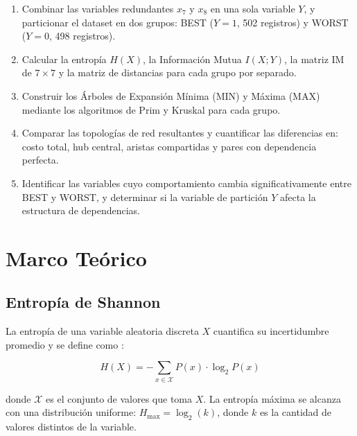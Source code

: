 \documentclass[12pt, a4paper]{article}
\begin{document}
\begin{enumerate}
    \item Combinar las variables redundantes $x_7$ y $x_8$ en una sola
          variable $Y$, y particionar el dataset en dos grupos:
          BEST ($Y = 1$, 502 registros) y WORST ($Y = 0$, 498 registros).

    \item Calcular la entropía $H(X)$, la Información Mutua
          $I(X;Y)$, la matriz IM de $7 \times 7$ y la matriz de
          distancias para cada grupo por separado.

    \item Construir los Árboles de Expansión Mínima (MIN) y
          Máxima (MAX) mediante los algoritmos de Prim y Kruskal
          para cada grupo.

    \item Comparar las topologías de red resultantes y cuantificar
          las diferencias en: costo total, hub central, aristas
          compartidas y pares con dependencia perfecta.

    \item Identificar las variables cuyo comportamiento cambia
          significativamente entre BEST y WORST, y determinar si la
          variable de partición $Y$ afecta la estructura de
          dependencias.
\end{enumerate}

\section{Marco Teórico}

\subsection{Entropía de Shannon}

La entropía de una variable aleatoria discreta $X$ cuantifica su
incertidumbre promedio y se define como \cite{shannon1948}:

\begin{equation}\label{eq:entropy}
    H(X) = -\sum_{x \in \mathcal{X}} P(x) \cdot \log_2 P(x)
\end{equation}

donde $\mathcal{X}$ es el conjunto de valores que toma $X$. La entropía
máxima se alcanza con una distribución uniforme: $H_{\max} = \log_2(k)$,
donde $k$ es la cantidad de valores distintos de la variable.
\end{document}
